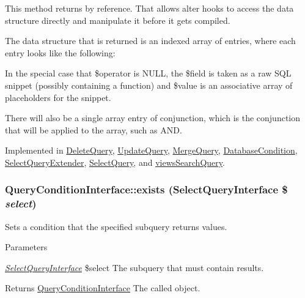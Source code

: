 This method returns by reference. That allows alter hooks to access the data structure directly and manipulate it before it gets compiled.

The data structure that is returned is an indexed array of entries, where each entry looks like the following: 


In the special case that \$operator is NULL, the \$field is taken as a raw SQL snippet (possibly containing a function) and \$value is an associative array of placeholders for the snippet.

There will also be a single array entry of conjunction, which is the conjunction that will be applied to the array, such as AND. 

Implemented in \hyperlink{classDeleteQuery_a6c7bf743c3747bc37fad92940fc8e753}{DeleteQuery}, \hyperlink{classUpdateQuery_a3c2a934f164d518ab4aeb5182e770a24}{UpdateQuery}, \hyperlink{classMergeQuery_a759f840d106e79a119d9130d09123b8d}{MergeQuery}, \hyperlink{classDatabaseCondition_a9a399f85011d31611a0a01f9d2b30f10}{DatabaseCondition}, \hyperlink{classSelectQueryExtender_a3d3779c339d6bb794e9c98dc361c07e4}{SelectQueryExtender}, \hyperlink{classSelectQuery_a5cdf8e2be2dfd407bdc34bfaa2c216ad}{SelectQuery}, and \hyperlink{classviewsSearchQuery_a9e059c456dbd678823b8e937be92301e}{viewsSearchQuery}.\hypertarget{interfaceQueryConditionInterface_a27a52b6e84393275ad2c54eaf1bd764a}{
\subsubsection[{exists}]{\setlength{\rightskip}{0pt plus 5cm}QueryConditionInterface::exists ({\bf SelectQueryInterface} \$ {\em select})}}
\label{interfaceQueryConditionInterface_a27a52b6e84393275ad2c54eaf1bd764a}
Sets a condition that the specified subquery returns values.


\begin{DoxyParams}{Parameters}
\item[{\em \hyperlink{interfaceSelectQueryInterface}{SelectQueryInterface}}]\$select The subquery that must contain results.\end{DoxyParams}
\begin{DoxyReturn}{Returns}
\hyperlink{interfaceQueryConditionInterface}{QueryConditionInterface} The called object. 
\end{DoxyReturn}


